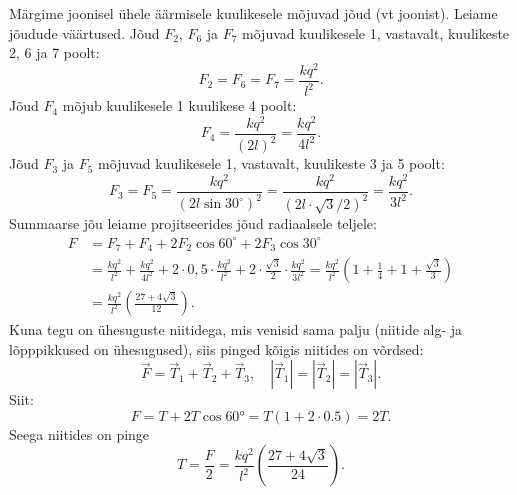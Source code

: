 Märgime joonisel ühele äärmisele kuulikesele mõjuvad jõud (vt joonist). Leiame jõudude väärtused. Jõud $F_2$, $F_6$ ja $F_7$ mõjuvad kuulikesele 1, vastavalt, kuulikeste 2, 6 ja 7 poolt:
\[
F_2 = F_6 = F_7 = \frac{kq^2}{l^2}.
\]
Jõud $F_4$ mõjub kuulikesele 1 kuulikese 4 poolt:
\[
F_{4}=\frac{k q^{2}}{(2 l)^{2}}=\frac{k q^{2}}{4 l^{2}}.
\]
Jõud $F_3$ ja $F_5$ mõjuvad kuulikesele 1, vastavalt, kuulikeste 3 ja 5 poolt:
\[
F_{3}=F_{5}=\frac{k q^{2}}{\left(2 l \sin 30^{\circ}\right)^{2}}=\frac{k q^{2}}{(2 l \cdot \sqrt{3} / 2)^{2}}=\frac{k q^{2}}{3 l^{2}}.
\]
Summaarse jõu leiame projitseerides jõud radiaalsele teljele:
\[
\begin{aligned}
F&=F_{7}+F_{4}+2 F_{2} \cos 60^{\circ}+2 F_{3} \cos 30^{\circ}\\
&=\frac{k q^{2}}{l^{2}}+\frac{k q^{2}}{4 l^{2}}+2 \cdot 0,5 \cdot \frac{k q^{2}}{l^{2}}+2 \cdot \frac{\sqrt{3}}{2} \cdot \frac{k q^{2}}{3 l^{2}}=\frac{k q^{2}}{l^{2}}\left(1+\frac{1}{4}+1+\frac{\sqrt{3}}{3}\right)\\
&=\frac{k q^{2}}{l^{2}}\left(\frac{27+4 \sqrt{3}}{12}\right).
\end{aligned}
\]
Kuna tegu on ühesuguste niitidega, mis venisid sama palju (niitide alg- ja lõpppikkused on ühesugused), siis pinged kõigis niitides on võrdsed: 
\[
\vec{F}=\vec{T}_{1}+\vec{T}_{2}+\vec{T}_{3}, \quad\left|\vec{T}_{1}\right|=\left|\vec{T}_{2}\right|=\left|\vec{T}_{3}\right|.
\]
Siit:
\[
F = T + 2T \cos \ang{60} = T (\num{1} + \num{2} \cdot \num{0,5}) = 2T.
\]
Seega niitides on pinge
\[
T=\frac{F}{2}=\frac{k q^{2}}{l^{2}}\left(\frac{27+4 \sqrt{3}}{24}\right).
\]
\probend